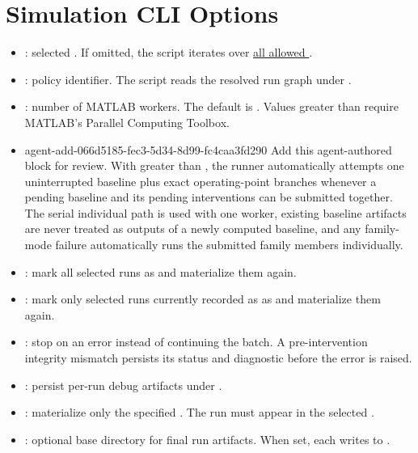 \documentclass[11pt]{article}
\begin{document}
\appendix
\section{Simulation CLI Options}
\label{sec:simulate-cli-options}

\begin{itemize}
\item {}: selected \termSimulator. If omitted, the script iterates over \hyperref[sec:allowed-tracebench-models]{all
allowed \name{} \termSimulators}.
\item {}: policy identifier. The script reads the resolved run graph under .
\item {}: number of MATLAB  workers. The default is . Values greater than 
require MATLAB's Parallel Computing Toolbox.
\item 
\agentProposedEdit
  {agent-add-066d5185-fec3-5d34-8d99-fc4caa3fd290}
  {Add this agent-authored block for review.}
  {}
  {With  greater than , the runner automatically attempts one uninterrupted baseline plus exact operating-point branches whenever a pending baseline and its pending interventions can be submitted together.
The serial individual path is used with one worker, existing baseline artifacts are never treated as outputs of a newly computed baseline, and any family-mode failure automatically runs the submitted family members individually.}
\item {}: mark all selected runs as  and materialize them again.
\item {}: mark only selected runs currently recorded as  as  and materialize them
again.
\item {}: stop on an error instead of continuing the batch. A pre-intervention integrity mismatch persists its  status and diagnostic before the error is raised.
\item {}: persist per-run debug artifacts under .
\item {}: materialize only the specified . The run must appear in the selected .
\item {}: optional base directory for final run artifacts. When set, each \termSimulator writes to
.

\end{itemize}
\end{document}
